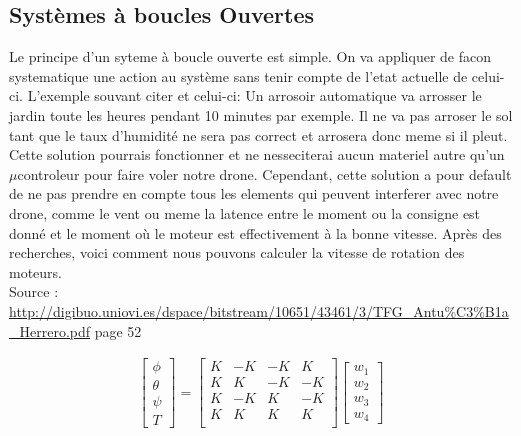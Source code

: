 \documentclass[10pt,a4paper]{article}
\begin{document}
\subsection{Systèmes à boucles Ouvertes}
Le principe d'un syteme à boucle ouverte est simple. On va appliquer de facon systematique une action au système sans tenir compte de l'etat actuelle de celui-ci. L'exemple souvant citer et celui-ci: Un arrosoir automatique va arrosser le jardin toute les heures pendant 10 minutes par exemple. Il ne va pas arroser le sol tant que le taux d'humidité ne sera pas correct et arrosera donc meme si il pleut.
Cette solution pourrais fonctionner et ne nesseciterai aucun materiel autre qu'un $\mu$controleur pour faire voler notre drone.
Cependant, cette solution a pour default de ne pas prendre en compte tous les elements qui peuvent interferer avec notre drone, comme le vent ou meme la latence entre le moment ou la consigne est donné et le moment où le moteur est effectivement à la bonne vitesse. Après des recherches, voici comment nous pouvons calculer la vitesse de rotation des moteurs.\\
Source : \url{http://digibuo.uniovi.es/dspace/bitstream/10651/43461/3/TFG_Antu%C3%B1a_Herrero.pdf} page 52
 
 
\begin{equation}\label{xx}
\begin{split}
%  
\begin{bmatrix}
   \phi \\
   \theta \\
   \psi \\
   T
\end{bmatrix}
=
\begin{bmatrix}
    K & -K & -K & K \\
    K & K & -K & -K \\
    K & -K & K & -K \\
    K & K & K & K \\
\end{bmatrix}
 \begin{bmatrix}
    w_1 \\
    w_2 \\
    w_3 \\
    w_4
\end{bmatrix}
\end{split}
\end{equation}
\end{document}
